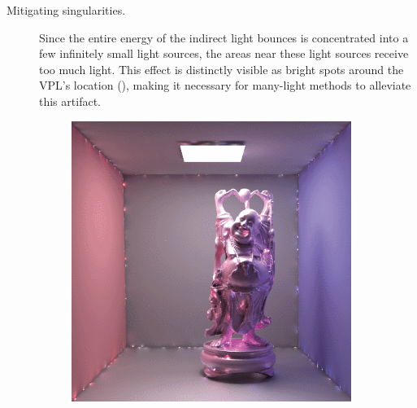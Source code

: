 \begin{description}
    \item[Mitigating singularities.] Since the entire energy of the indirect light bounces is concentrated into a few infinitely small light sources, the areas near these light sources receive too much light. This effect is distinctly visible as bright spots around the VPL's location (), making it necessary for many-light methods to alleviate this artifact.
\end{description}

\begin{figure}[htb]
    \centering
    \begin{subfigure}[b]{0.32\textwidth}
        \centering
        \includegraphics[width=1.0\linewidth]{graphics/clamping1-dachsbacher}%
        \caption{}
    \end{subfigure}%
    \hfill
    \begin{subfigure}[b]{0.32\textwidth}
        \centering

\end{subfigure}
\end{figure}
